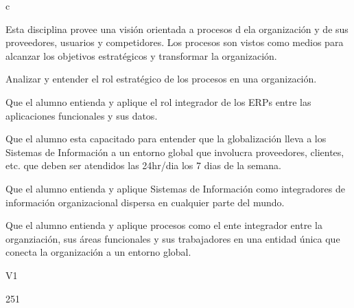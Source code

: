 c\begin{syllabus}


\begin{justification}
Esta disciplina provee una visión orientada a procesos d ela organización y de sus proveedores, usuarios y competidores. Los procesos son vistos como medios para alcanzar los objetivos estratégicos y transformar la organización.
\end{justification}

\begin{goals}
\item Analizar y entender el rol estratégico de los procesos en una organización.
\item Que el alumno entienda y aplique el rol integrador de los ERPs entre las aplicaciones funcionales y sus datos.
\item Que el alumno esta capacitado para entender que la globalización lleva a los Sistemas de Información a un entorno global que involucra proveedores, clientes, etc. que deben ser atendidos las 24hr/dia los 7 dias de la semana.
\item Que el alumno entienda y aplique Sistemas de Información como integradores de información organizacional dispersa en cualquier parte del mundo.
\item Que el alumno entienda y aplique procesos como el ente integrador entre la organziación, sus áreas funcionales y sus trabajadores en una entidad única que conecta la organización a un entorno global.
\end{goals}

\begin{outcomes}{V1}
\end{outcomes}

\begin{unit}{\LUTWOOHONEDef}{}{\LUTWOOHONEBib}{25}{1}
   \begin{topics}
   	\item \OMCONETopicTWOxONExEIGHT
		\begin{subtopics}
			\item \OMCONETopicTWOxONExEIGHTxONE
			\item \OMCONETopicTWOxONExEIGHTxTWO
			\item \OMCONETopicTWOxONExEIGHTxTHREE
			\item \OMCONETopicTWOxONExEIGHTxFOUR
		\end{subtopics}
   \end{topics}
	\LUTWOOHONEGoal
\end{unit}


\end{syllabus}
